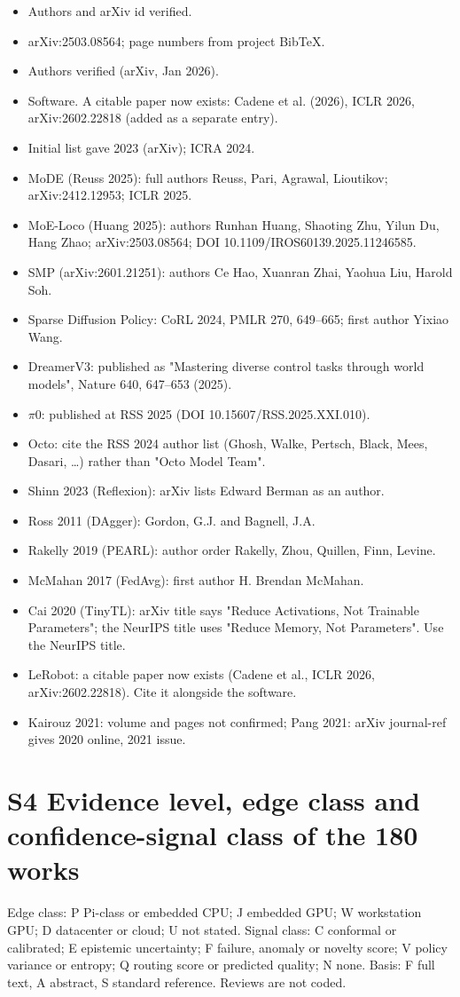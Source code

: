 \documentclass[10pt,a4paper]{article}
\begin{document}
\begin{itemize}
\item [Reuss 2025] Authors and arXiv id verified.
\item [Huang 2025] arXiv:2503.08564; page numbers from project BibTeX.
\item [SMP 2026] Authors verified (arXiv, Jan 2026).
\item [Cadene 2024] Software. A citable paper now exists: Cadene et al. (2026), ICLR 2026, arXiv:2602.22818 (added as a separate entry).
\item [OXE 2024] Initial list gave 2023 (arXiv); ICRA 2024.
\item MoDE (Reuss 2025): full authors Reuss, Pari, Agrawal, Lioutikov; arXiv:2412.12953; ICLR 2025.
\item MoE-Loco (Huang 2025): authors Runhan Huang, Shaoting Zhu, Yilun Du, Hang Zhao; arXiv:2503.08564; DOI 10.1109/IROS60139.2025.11246585.
\item SMP (arXiv:2601.21251): authors Ce Hao, Xuanran Zhai, Yaohua Liu, Harold Soh.
\item Sparse Diffusion Policy: CoRL 2024, PMLR 270, 649--665; first author Yixiao Wang.
\item DreamerV3: published as "Mastering diverse control tasks through world models", Nature 640, 647--653 (2025).
\item $\pi$0: published at RSS 2025 (DOI 10.15607/RSS.2025.XXI.010).
\item Octo: cite the RSS 2024 author list (Ghosh, Walke, Pertsch, Black, Mees, Dasari, \ldots{}) rather than "Octo Model Team".
\item Shinn 2023 (Reflexion): arXiv lists Edward Berman as an author.
\item Ross 2011 (DAgger): Gordon, G.J. and Bagnell, J.A.
\item Rakelly 2019 (PEARL): author order Rakelly, Zhou, Quillen, Finn, Levine.
\item McMahan 2017 (FedAvg): first author H. Brendan McMahan.
\item Cai 2020 (TinyTL): arXiv title says "Reduce Activations, Not Trainable Parameters"; the NeurIPS title uses "Reduce Memory, Not Parameters". Use the NeurIPS title.
\item LeRobot: a citable paper now exists (Cadene et al., ICLR 2026, arXiv:2602.22818). Cite it alongside the software.
\item Kairouz 2021: volume and pages not confirmed; Pang 2021: arXiv journal-ref gives 2020 online, 2021 issue.
\end{itemize}
\section*{S4 Evidence level, edge class and confidence-signal class of the 180 works}
Edge class: P Pi-class or embedded CPU; J embedded GPU; W workstation GPU; D datacenter or cloud; U not stated. Signal class: C conformal or calibrated; E epistemic uncertainty; F failure, anomaly or novelty score; V policy variance or entropy; Q routing score or predicted quality; N none. Basis: F full text, A abstract, S standard reference. Reviews are not coded.
\end{document}
